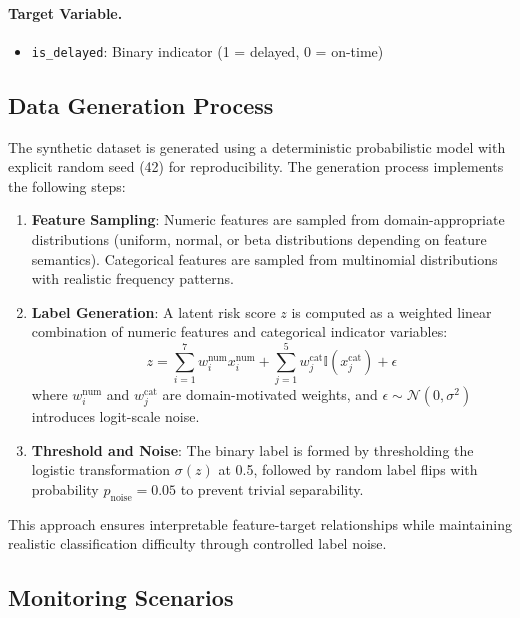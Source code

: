 \documentclass[11pt,a4paper]{article}
\begin{document}
\paragraph{Target Variable.}
\begin{itemize}
    \item \texttt{is\_delayed}: Binary indicator (1 = delayed, 0 = on-time)
\end{itemize}

\subsection{Data Generation Process}

The synthetic dataset is generated using a deterministic probabilistic model with explicit random seed (42) for reproducibility. The generation process implements the following steps:

\begin{enumerate}
    \item \textbf{Feature Sampling}: Numeric features are sampled from domain-appropriate distributions (uniform, normal, or beta distributions depending on feature semantics). Categorical features are sampled from multinomial distributions with realistic frequency patterns.
    
    \item \textbf{Label Generation}: A latent risk score $z$ is computed as a weighted linear combination of numeric features and categorical indicator variables:
    \begin{equation}
    z = \sum_{i=1}^{7} w_i^{\text{num}} x_i^{\text{num}} + \sum_{j=1}^{5} w_j^{\text{cat}} \mathbb{I}(x_j^{\text{cat}}) + \epsilon
    \end{equation}
    where $w_i^{\text{num}}$ and $w_j^{\text{cat}}$ are domain-motivated weights, and $\epsilon \sim \mathcal{N}(0, \sigma^2)$ introduces logit-scale noise.
    
    \item \textbf{Threshold and Noise}: The binary label is formed by thresholding the logistic transformation $\sigma(z)$ at 0.5, followed by random label flips with probability $p_{\text{noise}} = 0.05$ to prevent trivial separability.
\end{enumerate}

This approach ensures interpretable feature-target relationships while maintaining realistic classification difficulty through controlled label noise.

\subsection{Monitoring Scenarios}
\end{document}
